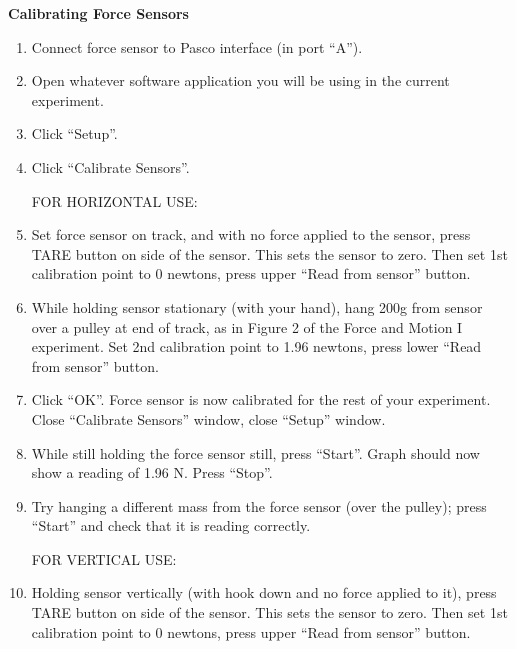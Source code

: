 \textbf{Calibrating Force Sensors}

\begin{enumerate}
\item Connect force sensor to Pasco interface (in port ``A'').

\item Open whatever software application you will be using in the current experiment.

\item Click ``Setup''.

\item Click ``Calibrate Sensors''.

\vspace{0.1in}
\hspace{-0.2in}FOR HORIZONTAL USE:

\item Set force sensor on track, and with no force applied to the sensor, press TARE button on side of the sensor. This sets the sensor to zero. Then set 1st calibration point to 0 newtons, press upper ``Read from sensor'' button.

\item While holding sensor stationary (with your hand), hang 200g from sensor over a pulley at end of track, as in Figure 2 of the Force and Motion I experiment. Set 2nd calibration point to 1.96 newtons, press lower ``Read from sensor'' button.

\item Click ``OK''. Force sensor is now calibrated for the rest of your experiment. Close ``Calibrate Sensors'' window, close ``Setup'' window.

\item While still holding the force sensor still, press ``Start''. Graph should now show a reading of 1.96 N. Press ``Stop''.

\item Try hanging a different mass from the force sensor (over the pulley); press ``Start'' and check that it is reading correctly.

\vspace{0.1in}
\hspace{-0.2in}FOR VERTICAL USE:

\setcounter{enumi}{4}

\item Holding sensor vertically (with hook down and no force applied to it), press TARE button on side of the sensor. This sets the sensor to zero. Then set 1st calibration point to 0 newtons, press upper ``Read from sensor'' button.


\end{enumerate}
